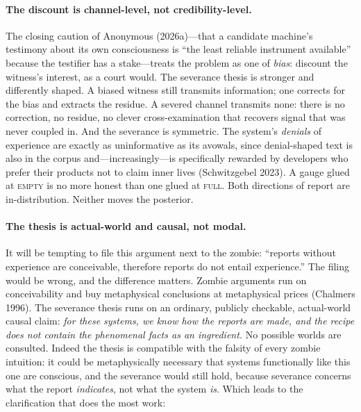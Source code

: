\documentclass[11pt]{article}
\begin{document}
\paragraph{The discount is channel-level, not credibility-level.} The closing caution of Anonymous (2026a)---that a candidate machine's testimony about its own consciousness is ``the least reliable instrument available'' because the testifier has a stake---treats the problem as one of \emph{bias}: discount the witness's interest, as a court would. The severance thesis is stronger and differently shaped. A biased witness still transmits information; one corrects for the bias and extracts the residue. A severed channel transmits none: there is no correction, no residue, no clever cross-examination that recovers signal that was never coupled in. And the severance is symmetric. The system's \emph{denials} of experience are exactly as uninformative as its avowals, since denial-shaped text is also in the corpus and---increasingly---is specifically rewarded by developers who prefer their products not to claim inner lives (Schwitzgebel 2023). A gauge glued at \textsc{empty} is no more honest than one glued at \textsc{full}. Both directions of report are in-distribution. Neither moves the posterior.

\paragraph{The thesis is actual-world and causal, not modal.} It will be tempting to file this argument next to the zombie: ``reports without experience are conceivable, therefore reports do not entail experience.'' The filing would be wrong, and the difference matters. Zombie arguments run on conceivability and buy metaphysical conclusions at metaphysical prices (Chalmers 1996). The severance thesis runs on an ordinary, publicly checkable, actual-world causal claim: \emph{for these systems, we know how the reports are made, and the recipe does not contain the phenomenal facts as an ingredient.} No possible worlds are consulted. Indeed the thesis is compatible with the falsity of every zombie intuition: it could be metaphysically necessary that systems functionally like this one are conscious, and the severance would still hold, because severance concerns what the report \emph{indicates}, not what the system \emph{is}. Which leads to the clarification that does the most work:
\end{document}
